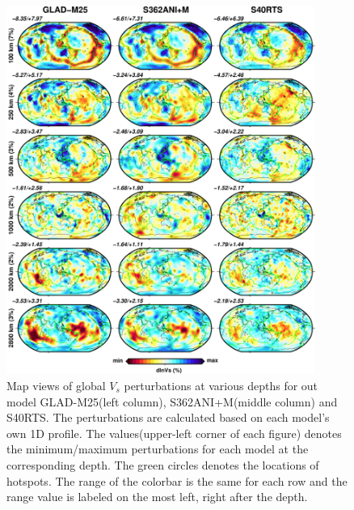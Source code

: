 \documentclass[extra,mreferee]{gji}
\begin{document}
\begin{figure}
\includegraphics[width=0.9\textwidth]{figures/depth_slice/globe_vs.pdf}
\caption{Map views of global $V_s$ perturbations at various depths for out model GLAD-M25(left column), S362ANI+M(middle column)\cite{} and S40RTS\cite{}. The perturbations are calculated based on each model's own 1D profile. The values(upper-left corner of each figure) denotes the minimum/maximum perturbations for each model at the corresponding depth. The green circles denotes the locations of hotspots\cite{}. The range of the colorbar is the same for each row and the range value is labeled on the most left, right after the depth.}
\label{fig:global-vs}
\centering
\end{figure}
\end{document}
